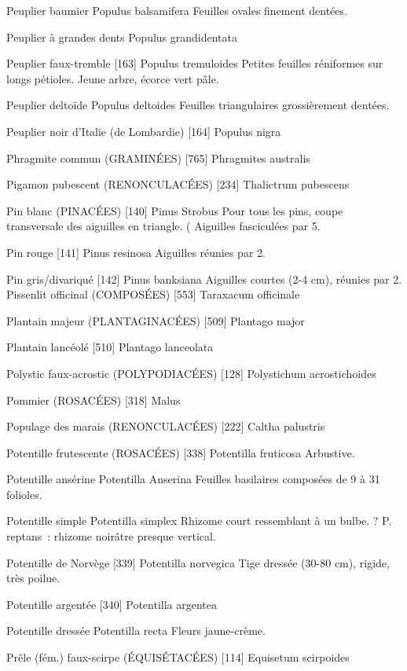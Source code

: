 Peuplier baumier
				Populus balsamifera
Feuilles ovales finement dentées.

Peuplier à grandes dents
				Populus grandidentata

Peuplier faux-tremble  [163]
				Populus tremuloides
Petites feuilles réniformes sur longs pétioles.
Jeune arbre, écorce vert pâle.

Peuplier deltoïde
				Populus deltoides
Feuilles triangulaires grossièrement dentées.

Peuplier noir d’Italie (de Lombardie)  [164]
				Populus nigra

Phragmite commun (GRAMINÉES)  [765]
				Phragmites australis

Pigamon pubescent (RENONCULACÉES)  [234]
				Thalictrum pubescens

Pin blanc (PINACÉES)  [140]
				Pinus Strobus
Pour tous les pins, coupe transversale des aiguilles en triangle. (
Aiguilles fasciculées par 5.

Pin rouge  [141]
				Pinus resinosa
Aiguilles réunies par 2.

Pin gris/divariqué  [142]
				Pinus banksiana
Aiguilles courtes (2-4 cm), réunies par 2.
Pissenlit officinal (COMPOSÉES)  [553]
				Taraxacum officinale

Plantain majeur (PLANTAGINACÉES)  [509]
				Plantago major

Plantain lancéolé  [510]
				Plantago lanceolata

Polystic faux-acrostic (POLYPODIACÉES)  [128]
				Polystichum acrostichoides

Pommier (ROSACÉES)  [318]
				Malus

Populage des marais (RENONCULACÉES)  [222]
				Caltha palustris

Potentille frutescente (ROSACÉES)  [338]
				Potentilla fruticosa
Arbustive.



Potentille ansérine
				Potentilla Anserina
Feuilles basilaires composées de 9 à 31 folioles.

Potentille simple
				Potentilla simplex
Rhizome court ressemblant à un bulbe.
? P. reptans : rhizome noirâtre presque vertical.

Potentille de Norvège  [339]
				Potentilla norvegica
Tige dressée (30-80 cm), rigide, très poilue.

Potentille argentée  [340]
				Potentilla argentea

Potentille dressée
				Potentilla recta
Fleurs jaune-crème.

Prêle (fém.) faux-scirpe (ÉQUISÉTACÉES) [114]
				Equisetum scirpoides

